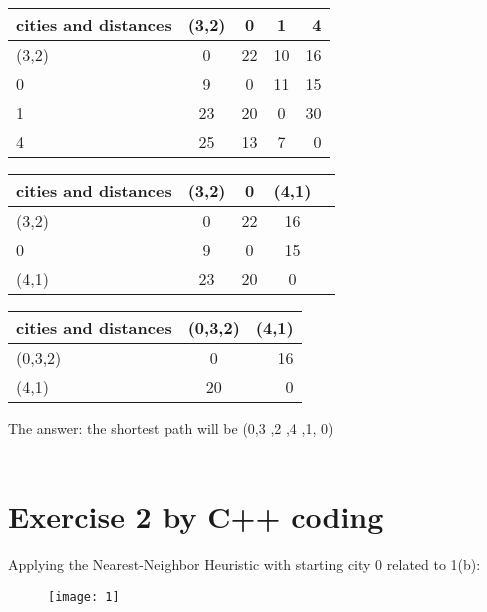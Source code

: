\documentclass[12pt, letterpaper]{article}
\begin{document}
\begin{center} 
	
	\begin{tabular}{|l|| c|c| c| r|}
		\hline
		cities and distances & (3,2) & 0 & 1 & 4 \\
		\hline \hline
		(3,2) & 0 & 22  & 10  & 16\\
		\hline
		0 &9& 0 &11& 15\\
		\hline
		1 &23 &20 &0 &30\\
		\hline
		4 &25 &13 & {\color{blue}7}& 0\\
		\hline
	\end{tabular}
\end{center}

\begin{center} 
	
	\begin{tabular}{|l|| c| c| c| r|}
		\hline
		cities and distances & (3,2) & 0 & (4,1) \\
		\hline \hline
     (3,2) & 0 & 22 & 16\\
		\hline
		0 &{\color{blue}9} &0 &15\\
		\hline
		(4,1) &23& 20& 0\\
		\hline
	\end{tabular}
\end{center}

\begin{center} 
	
	\begin{tabular}{|l|| c| r|}
		\hline
		cities and distances & (0,3,2)  & (4,1) \\
		\hline \hline
		(0,3,2) & 0 & {\color{blue}16}\\
		\hline
		(4,1) &20& 0\\
		\hline
	\end{tabular}
\end{center}
The answer:
the shortest path will be (0,3 ,2 ,4 ,1, 0)\\


~\\
\section{Exercise 2 by C++ coding}

  Applying the Nearest-Neighbor Heuristic with starting city 0 related to 1(b):

\begin{figure}[H]
	\centering
	\texttt{[image: 1]}
	\caption{}
	\label{fig:1}
\end{figure}
\end{document}
